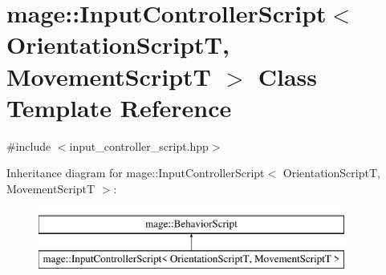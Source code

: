 \hypertarget{classmage_1_1_input_controller_script}{}\section{mage\+:\+:Input\+Controller\+Script$<$ Orientation\+ScriptT, Movement\+ScriptT $>$ Class Template Reference}
\label{classmage_1_1_input_controller_script}


{\ttfamily \#include $<$input\+\_\+controller\+\_\+script.\+hpp$>$}

Inheritance diagram for mage\+:\+:Input\+Controller\+Script$<$ Orientation\+ScriptT, Movement\+ScriptT $>$\+:\begin{figure}[H]
\begin{center}
\leavevmode
\includegraphics[height=2.000000cm]{classmage_1_1_input_controller_script}
\end{center}
\end{figure}
